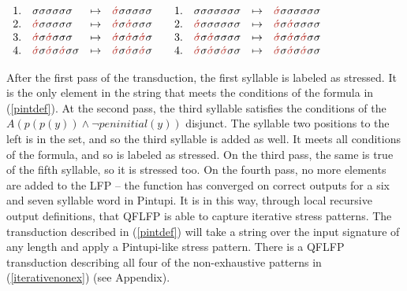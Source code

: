 \documentclass[12pt]{article}
\newcommand{\sig}{\sigma}
\newcommand{\ass}{\acute{\sig}}
\newcommand{\brass}{{\color{BrickRed}{\ass}}}
\begin{document}
 \begin{exe} 
 \item
 $\begin{array}[t]{llll}
  	1. &\sig\sig\sig\sig\sig\sig & \mapsto & \brass\sig\sig\sig\sig\sig            \\
  	2. &\brass\sig\sig\sig\sig\sig & \mapsto & \brass\sig\brass\sig\sig\sig        \\
  	3. &\brass\sig\brass\sig\sig\sig & \mapsto & \brass\sig\brass\sig\brass\sig         \\
  	4. &\brass\sig\brass\sig\brass\sig\sig & \mapsto & \brass\sig\brass\sig\brass\sig   \\ 
  \end{array}
  \hspace{1em}
  \begin{array}[t]{llll}
  	1. &\sig\sig\sig\sig\sig\sig\sig & \mapsto & \brass\sig\sig\sig\sig\sig\sig     \\
  	2. &\brass\sig\sig\sig\sig\sig\sig & \mapsto & \brass\sig\brass\sig\sig\sig\sig                \\
  	3. &\brass\sig\brass\sig\sig\sig\sig & \mapsto & \brass\sig\brass\sig\brass\sig\sig         \\
  	4. &\brass\sig\brass\sig\brass\sig\sig & \mapsto & \brass\sig\brass\sig\brass\sig\sig   \\ 
  	 	\end{array}$
  	 	\label{pinttrans}
\end{exe}

\noindent
After the first pass of the transduction, the first syllable is labeled as stressed. It is the only element in the string that meets the conditions of the formula in (\ref{pintdef}). At the second pass, the third syllable satisfies the conditions of the $A(p(p(y)) \land \neg peninitial(y))$ disjunct. The syllable two positions to the left is in the set, and so the third syllable is added as well. It meets all conditions of the formula, and so is labeled as stressed. On the third pass, the same is true of the fifth syllable, so it is stressed too. On the fourth pass, no more elements are added to the LFP -- the function has converged on correct outputs for a six and seven syllable word in Pintupi. It is in this way, through local recursive output definitions, that QFLFP is able to capture iterative stress patterns. The transduction described in (\ref{pintdef}) will take a string over the input signature of any length and apply a Pintupi-like stress pattern. There is a QFLFP transduction describing all four of the non-exhaustive patterns in (\ref{iterativenonex}) (see Appendix). 
\end{document}
